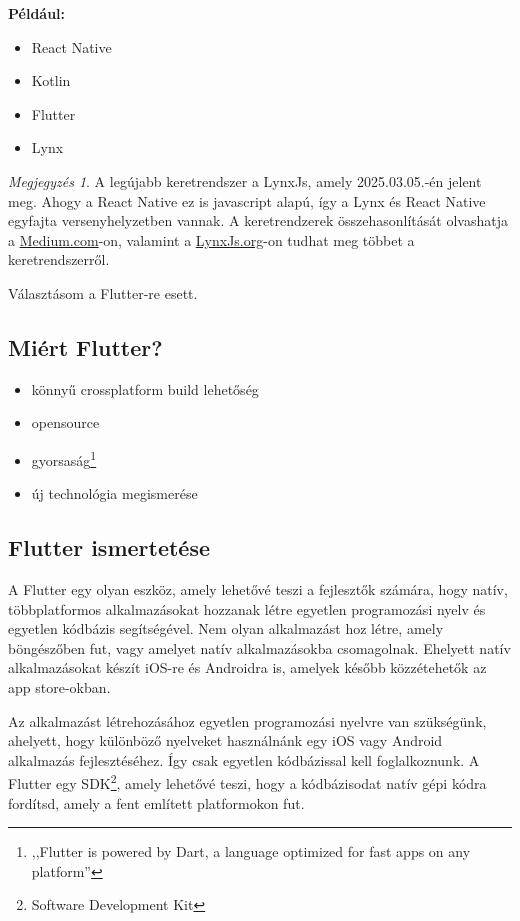 \documentclass{thesis-ekf}
\theoremstyle{definition}
\theoremstyle{remark}
\newtheorem{megjegyzes}{Megjegyzés}
\begin{document}
	\textbf{Például:}
	\begin{itemize}
		\item React Native
		\item Kotlin
		\item Flutter
		\item Lynx
	\end{itemize}
	\begin{megjegyzes}
		A legújabb keretrendszer a LynxJs, amely 2025.03.05.-én jelent meg. Ahogy a React Native ez is javascript alapú, így a Lynx és React Native egyfajta versenyhelyzetben vannak. A keretrendzerek összehasonlítását olvashatja a  \href{https://medium.com/@mostsignificant/introducing-lynx-how-tiktoks-new-framework-compares-to-react-native-580a52d3462c}{Medium.com}-on, valamint a \href{https://lynxjs.org/}{LynxJs.org}-on tudhat meg többet a keretrendszerről.
	\end{megjegyzes}
	Választásom a Flutter-re esett. 
	\subsection{Miért Flutter?}
	\begin{itemize}
		\item könnyű crossplatform build lehetőség
		\item opensource
		\item gyorsaság\footnote{,,Flutter is powered by Dart, a language optimized for fast apps on any platform''\cite{bib_flutter_web}}
		\item új technológia megismerése
	\end{itemize}
	\subsection{Flutter ismertetése}
	A Flutter egy olyan eszköz, amely lehetővé teszi a fejlesztők számára, hogy natív, többplatformos alkalmazásokat hozzanak létre egyetlen programozási nyelv és egyetlen kódbázis segítségével. Nem olyan alkalmazást hoz létre, amely böngészőben fut, vagy amelyet natív alkalmazásokba csomagolnak. Ehelyett natív alkalmazásokat készít iOS-re és Androidra is, amelyek később közzétehetők az app store-okban.
	
	
	Az alkalmazást létrehozásához egyetlen programozási nyelvre van szükségünk, ahelyett, hogy különböző nyelveket használnánk egy iOS vagy Android alkalmazás fejlesztéséhez. Így csak egyetlen kódbázissal kell foglalkoznunk. A Flutter egy SDK\footnote{Software Development Kit}, amely lehetővé teszi, hogy a kódbázisodat natív gépi kódra fordítsd, amely a fent említett platformokon fut.
	
\end{document}
